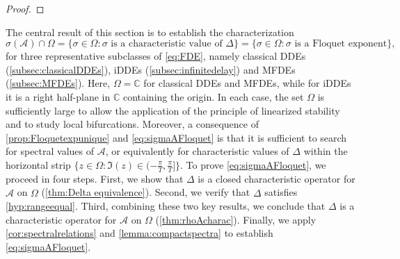 \documentclass[english]{myarticle}
\begin{document}
\begin{sloppypar}
\begin{proof}
\end{proof}
The central result of this section is to establish the characterization
\begin{equation} \label{eq:sigmaAFloquet}
    \sigma(\mathcal{A}) \cap \Omega 
    = \{ \sigma \in \Omega : \sigma \text{ is a characteristic value of } \Delta \} 
    = \{ \sigma \in \Omega : \sigma \text{ is a Floquet exponent} \},
\end{equation}
for three representative subclasses of \eqref{eq:FDE}, namely classical DDEs (\cref{subsec:classicalDDEs}), iDDEs (\cref{subsec:infinitedelay}) and MFDEs (\cref{subsec:MFDEs}). Here, $\Omega = \mathbb{C}$ for classical DDEs and MFDEs, while for iDDEs it is a right half-plane in $\mathbb{C}$ containing the origin. In each case, the set $\Omega$ is sufficiently large to allow the application of the principle of linearized stability and to study local bifurcations. Moreover, a consequence of \cref{prop:Floquetexpunique} and \eqref{eq:sigmaAFloquet} is that it is sufficient to search for spectral values of $\mathcal{A}$, or equivalently for characteristic values of $\Delta$ within the horizontal strip $\{ z \in \Omega : \Im(z) \in (-\frac{\pi}{T},\frac{\pi}{T}] \}$. To prove \eqref{eq:sigmaAFloquet}, we proceed in four steps. First, we show that $\Delta$ is a closed characteristic operator for $\hat{\mathcal{A}}$ on $\Omega$ (\cref{thm:Delta equivalence}). Second, we verify that $\Delta$ satisfies \ref{hyp:rangeequal}. Third, combining these two key results, we conclude that $\Delta$ is a characteristic operator for $\mathcal{A}$ on $\Omega$ (\cref{thm:rhoAcharac}). Finally, we apply \cref{cor:spectralrelations} and \cref{lemma:compactspectra} to establish \eqref{eq:sigmaAFloquet}.


\end{sloppypar}
\end{document}

